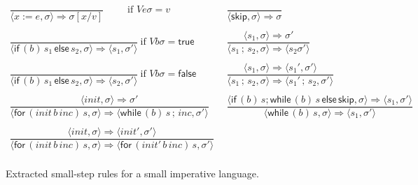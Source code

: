 \documentclass{llncs}
\newcommand{\true}{\mathsf {true}}
\newcommand{\false}{\mathsf {false}}
\newcommand{\keyword}[1]{\mathsf{#1}}
\newcommand{\SKIP}{\keyword{skip}}
\newcommand{\ASG}[2]{#1 := #2}
\newcommand{\SEQ}[2]{#1\,{;}\,#2}
\newcommand{\IFNZ}[3]{\keyword{if} \,(#1)\, #2\,\keyword{else}\,#3}
\newcommand{\FOR}[4]{\keyword{for} \,(#1\,#2\,#3)\, #4}
\newcommand{\WHILE}[2]{\keyword{while} \,(#1)\, #2}
\begin{document}
\begin{figure}
\[
\begin{array}{l|l}
 \dfrac{ } 
{\langle \ASG{x}{e}, \sigma \rangle \Rightarrow \sigma[x/v]}
 ~~~~~~~~~~~\text{if } V e \sigma = v~~~

&~

\dfrac{} 
{\langle \SKIP, \sigma \rangle \Rightarrow \sigma}
\\
\\
\dfrac{} 
{\langle \IFNZ{b}{s_1}{s_2}, \sigma \rangle \Rightarrow \langle s_1,\sigma'\rangle}
 ~\text{if } V b \sigma = \true
&~
\dfrac{\langle s_1, \sigma \rangle \Rightarrow \sigma' } 
{\langle \SEQ{s_1}{s_2}, \sigma \rangle \Rightarrow \langle s_2 \sigma'\rangle}~~~
\\
 \\
 \dfrac{} 
{\langle \IFNZ{b}{s_1}{s_2}, \sigma \rangle \Rightarrow \langle s_2,\sigma'\rangle}
 ~\text{if } V b \sigma = \false
&~
 \dfrac{\langle s_1, \sigma \rangle \Rightarrow \langle s_1', \sigma'\rangle} 
{\langle \SEQ{s_1}{s_2}, \sigma \rangle \Rightarrow \langle \SEQ{s_1'}{s_2}, \sigma'\rangle}~~~
 ~

\\
 \\
\dfrac{\langle \mathit{init}, \sigma \rangle \Rightarrow \sigma' } 
{\langle \FOR{\mathit{init}}{b}{\mathit{inc}}{s}, \sigma \rangle \Rightarrow \langle \WHILE{b}{\SEQ{s}{\mathit{inc}}}, \sigma' \rangle}
 ~
&~
\dfrac{\langle \IFNZ{b}{s;\WHILE{b}{s}}{\SKIP}, \sigma \rangle \Rightarrow \langle s_1,\sigma'\rangle} 
{\langle \WHILE{b}{s}, \sigma \rangle \Rightarrow \langle s_1,\sigma'\rangle}
\\
\\
 \dfrac{\langle \mathit{init}, \sigma \rangle \Rightarrow\langle \mathit{init}', \sigma' \rangle } 
{\langle \FOR{\mathit{init}}{b}{\mathit{inc}}{s}, \sigma \rangle \Rightarrow \langle \FOR{\mathit{init}'}{b}{\mathit{inc}}{s}, \sigma' \rangle}
 ~
&~
\\
 \end{array}
\]
\caption{Extracted small-step rules for a small imperative language.}\label{small-step-rules}
\end{figure}
\end{document}
